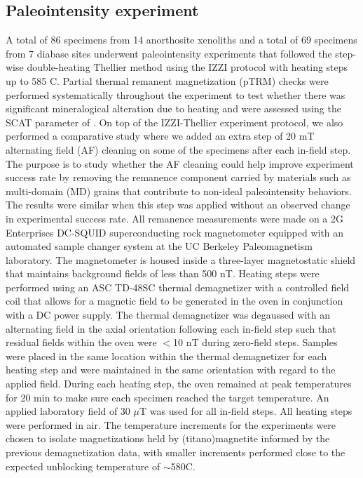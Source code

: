 \documentclass[9pt,twocolumn,twoside,lineno]{pnas-new}
\begin{document}
{\subsection*{Paleointensity experiment}
A total of 86 specimens from 14 anorthosite xenoliths and a total of 69 specimens from 7 diabase sites underwent paleointensity experiments that followed the step-wise double-heating Thellier method \cite{Thellier1959a} using the IZZI protocol \cite{Yu2004a} with heating steps up to 585 \textdegree C. Partial thermal remanent magnetization (pTRM) checks were performed systematically throughout the experiment to test whether there was significant mineralogical alteration due to heating and were assessed using the SCAT parameter of  \citealp{Shaar2013a}. On top of the IZZI-Thellier experiment protocol, we also performed a comparative study where we added an extra step of 20 mT alternating field (AF) cleaning on some of the specimens after each in-field step. The purpose is to study whether the AF cleaning could help improve experiment success rate by removing the remanence component carried by materials such as multi-domain (MD) grains that contribute to non-ideal paleointensity behaviors. The results were similar when this step was applied without an observed change in experimental success rate. All remanence measurements were made on a 2G Enterprises DC-SQUID superconducting rock magnetometer equipped with an automated sample changer system at the UC Berkeley Paleomagnetism laboratory. The magnetometer is housed inside a three-layer magnetostatic shield that maintains background fields of less than 500 nT. Heating steps were performed using an ASC TD-48SC thermal demagnetizer with a controlled field coil that allows for a magnetic field to be generated in the oven in conjunction with a DC power supply. The thermal demagnetizer was degaussed with an alternating field in the axial orientation following each in-field step such that residual fields within the oven were $<$10 nT during zero-field steps. Samples were placed in the same location within the thermal demagnetizer for each heating step and were maintained in the same orientation with regard to the applied field. During each heating step, the oven remained at peak temperatures for 20 min to make sure each specimen reached the target temperature. An applied laboratory field of 30 $\mu$T was used for all in-field steps. All heating steps were performed in air. The temperature increments for the experiments were chosen to isolate magnetizations held by (titano)magnetite informed by the previous demagnetization data, with smaller increments performed close to the expected unblocking temperature of $\sim$580\textdegree C. 

}
\end{document}
